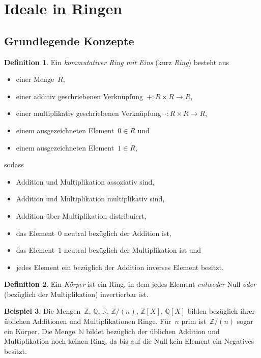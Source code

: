 \documentclass[a4paper,ngerman,12pt]{scrartcl}
\theoremstyle{definition}
\newtheorem{defn}{Definition}[section]
\newtheorem{bsp}[defn]{Beispiel}
\theoremstyle{plain}
\theoremstyle{remark}
\newcommand{\ZZ}{\mathbb{Z}}
\newcommand{\QQ}{\mathbb{Q}}
\newcommand{\RR}{\mathbb{R}}
\newcommand{\NN}{\mathbb{N}}
\renewcommand{\_}{\mathpunct{.}\,}
\newcommand{\?}{\,{:}\,}
\begin{document}
\appendix
\section{Ideale in Ringen}
\label{appendix:ideale}

\subsection{Grundlegende Konzepte}

\begin{defn}Ein \emph{kommutativer Ring mit Eins} (kurz \emph{Ring}) besteht aus
\begin{itemize}
\item einer Menge~$R$,
\item einer additiv geschriebenen Verknüpfung~${+} : R \times R \to R$,
\item einer multiplikativ geschriebenen Verknüpfung~${\cdot} : R \times R \to R$,
\item einem ausgezeichneten Element~$0 \in R$ und
\item einem ausgezeichneten Element~$1 \in R$,
\end{itemize}
sodass
\begin{itemize}
\item Addition und Multiplikation assoziativ sind,
\item Addition und Multiplikation multiplikativ sind,
\item Addition über Multiplikation distribuiert,
\item das Element~$0$ neutral bezüglich der Addition ist,
\item das Element~$1$ neutral bezüglich der Multiplikation ist und
\item jedes Element ein bezüglich der Addition inverses Element besitzt.
\end{itemize}
\end{defn}

\begin{defn}Ein \emph{Körper} ist ein Ring, in dem jedes Element
\emph{entweder} Null \emph{oder} (bezüglich der Multiplikation) invertierbar
ist.\end{defn}

\begin{bsp}Die Mengen~$\ZZ$, $\QQ$, $\RR$, $\ZZ/(n)$, $\ZZ[X]$, $\QQ[X]$ bilden
bezüglich ihrer üblichen Additionen und Multiplikationen Ringe. Für~$n$ prim
ist~$\ZZ/(n)$ sogar ein Körper. Die Menge~$\NN$ bildet bezüglich der üblichen
Addition und Multiplikation noch keinen Ring, da bis auf die Null kein Element
ein Negatives besitzt.\end{bsp}
\end{document}
